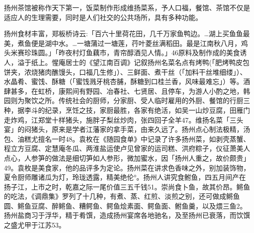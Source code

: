 
扬州茶馆被称作天下第一，饭菜制作形成维扬菜系，予人口福，餐馆、茶馆不仅是适应人的生理需要，同时是人们社交的公共场所，具有多种功能。

\vfill
\begin{BookNotes}
\end{BookNotes}

扬州食材丰富，郑板桥诗云:「百六十里荷花田，几千万家鱼鸭边。…湖上买鱼鱼最美，煮鱼便是湖中水。…一塘蒲过一塘莲，荇叶菱丝满稻田。最是江南秋八月，鸡头米赛珍珠圆。」「昨夜村灯鱼藕市，青帘醇酒见人情。」46原料及制作成的美食诱人，溢于纸上。惺庵居士的《望江南百调》记叙扬州名菜名点有烤鸭(「肥烤鸭皮包饼夹，浓烧猪肉醮馒头，口福几生修」）、三鲜面、煮干丝（「加料干丝堆细缕」）、水晶肴、蜜饯、酥糖（「蜜饯溅牙桃杏脯，酥糖到口桂兰香，风味最难忘」）等。酒肆甚多，在虹桥，康熙间有野园、冶春社、七贤居、且停车，为游人小酌之地，韩园则为聚饮之所。传统社会的厨师，分家厨、受人临时雇用的外厨、餐馆的行厨三种，据李斗的纪录，烹饪之技，家厨最胜，各家有绝活，如吴一山炒豆腐，田雁门走炸鸡，江郑堂十样猪头，施胖子梨丝炒肉，张四回子全羊47。维扬名菜「三头宴」的闷猪头，原来是学者江藩家的拿手菜，由来久远了。扬州点心制法极精，汤包、油糕尤擅名一时48。袁枚在《随园食单》中记录了许多扬州菜，如剥壳蒸蟹、程立方豆腐、定慧庵冬瓜、两淮盐运使卢见曾家的运司糕、洪府粽子，仪征萧美人点心，人参笋的做法是细切笋如人参形，微加蜜水，因「扬州人重之，故价颇贵」49。袁枚是美食家，他的品评多为定论。扬州菜在讲求色香味之外，别加装饰物，夏令厨师雕诸瓜为灯，玲珑透露，精美绝伦°。扬州人讲究食鲋鱼，四五月间产在扬子江，上市之时，乾嘉之际一尾价值三五千钱51。崇尚食卜鱼，故其价昂。鳉鱼的吃法，《调鼎集》罗列了十几种，有煮、蒸、红煎、淡煎之别，还可做成鳉鱼圆、鳉鱼豆腐、醉鳉鱼、糟鳄鱼、鳄鱼烩素面、鳄鱼面、鲋鱼羹，以及煨三鱼2。扬州盐商习于浮华，精于肴馔，造成扬州宴席各地驰名，及至扬州已衰落，而饮馔之盛尤甲于江苏53。

\vfill
\begin{BookNotes}
\end{BookNotes}

